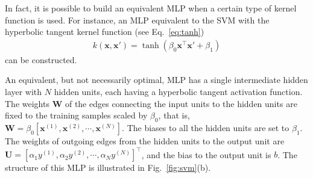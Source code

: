 \documentclass[dissertation,nocontribution,draft*]{aaltoseries}
\newcommand{\vect}[1]{\mathbf{#1}}
\newcommand{\matr}[1]{\mathbf{#1}}
\newcommand{\vx}[0]{\vect{x}}
\newcommand{\mW}[0]{\matr{W}}
\newcommand{\mU}[0]{\matr{U}}
\begin{document}
In fact, it is possible to build an equivalent MLP when a
certain type of kernel function is used. For instance, an
MLP equivalent to the SVM with the hyperbolic tangent kernel
function (see Eq.~\eqref{eq:tanh})
\begin{align*}
    k(\vx, \vx') = \tanh(\beta_0 \vx^\top \vx' + \beta_1)
\end{align*}
can be constructed.

An equivalent, but not necessarily optimal, MLP has a
single intermediate hidden layer with $N$ hidden units, each
having a hyperbolic tangent activation function. The weights
$\mW$ of the edges connecting the input units to the hidden
units are fixed to the training samples scaled by $\beta_0$,
that is, $\mW = \beta_0 \left[ \vx^{(1)}, \vx^{(2)}, \cdots,
\vx^{(N)} \right]$. The biases to all the hidden units are
set to $\beta_1$. The weights of outgoing edges from the
hidden units to the output unit are $\mU = \left[ \alpha_1 y^{(1)}, \alpha_2 y^{(2)}, \cdots, \alpha_N y^{(N)}
\right]^\top$, and the bias to the output unit is $b$. The
structure of this MLP is illustrated in
Fig.~\ref{fig:svm}(b).
\end{document}
